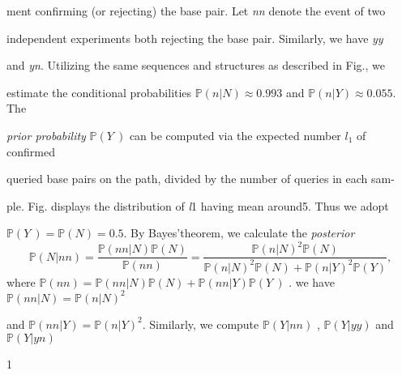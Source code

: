 \documentclass[a4paper,12pt]{article}
\begin{document}
ment confirming (or rejecting) the base pair. Let {\it nn} denote the event of two

independent experiments both rejecting the base pair. Similarly, we have {\it yy}

and {\it yn}. Utilizing the same sequences and structures as described in Fig., we

estimate the conditional probabilities $\mathbb{P}(n|N)\approx 0.993$ and $\mathbb{P}(n|Y) \approx 0.055$. The

{\it prior probability} $\mathbb{P} (Y\ )$ can be computed via the expected number $l_{1}$ of confirmed

queried base pairs on the path, divided by the number of queries in each sam-

ple. Fig. displays the distribution of {\it l}1 having mean around5. Thus we adopt

$\mathbb{P} (Y\ ) =\mathbb{P}(N)=0.5$. By Bayes’theorem, we calculate the {\it posterior}
$$
\mathbb{P}(N|nn)=\frac{\mathbb{P}(nn|N)\mathbb{P}(N)}{\mathbb{P}(nn)}=\frac{\mathbb{P}(n|N)^{2}\mathbb{P}(N)}{\mathbb{P}(n|N)^{2}\mathbb{P}(N)+\mathbb{P}(n|Y)^{2}\mathbb{P}(Y)},
$$
where $\mathbb{P}(nn) = \mathbb{P}(nn|N)\mathbb{P}(N)+\mathbb{P}(nn|Y)\mathbb{P}(Y\ )$ . we have $\mathbb{P}(nn|N) = \mathbb{P}(n|N)^{2}$

and $\mathbb{P} (nn|Y) =\mathbb{P}(n|Y)^{2}$. Similarly, we compute $\mathbb{P}(Y|nn)$ , $\mathbb{P}(Y|yy)$ and $\mathbb{P}(Y|yn)$

1
\end{document}
